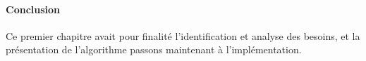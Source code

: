 \paragraph{Conclusion} %
Ce premier chapitre avait pour finalité l'identification et analyse des besoins, et la présentation de l'algorithme passons maintenant à l'implémentation.